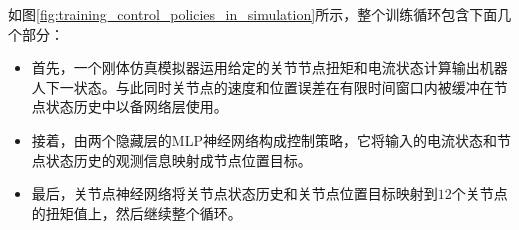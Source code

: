 如图\ref{fig:training_control_policies_in_simulation}所示，整个训练循环包含下面几个部分：
\begin{itemize}
    \item 首先，一个刚体仿真模拟器运用给定的关节节点扭矩和电流状态计算输出机器人下一状态。与此同时关节点的速度和位置误差在有限时间窗口内被缓冲在节点状态历史中以备网络层使用。
    \item 接着，由两个隐藏层的MLP神经网络构成控制策略，它将输入的电流状态和节点状态历史的观测信息映射成节点位置目标。
    \item 最后，关节点神经网络将关节点状态历史和关节点位置目标映射到$12$个关节点的扭矩值上，然后继续整个循环。
\end{itemize}